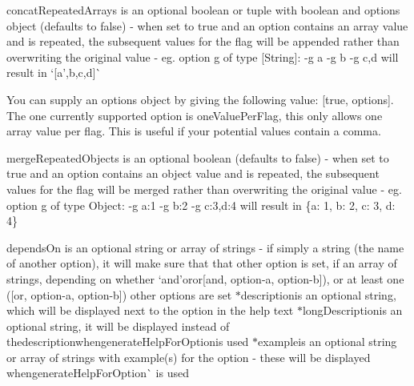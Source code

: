 \begin{DoxyItemize}
\item {\ttfamily concat\+Repeated\+Arrays} is an optional boolean or tuple with boolean and options object (defaults to {\ttfamily false}) -\/ when set to {\ttfamily true} and an option contains an array value and is repeated, the subsequent values for the flag will be appended rather than overwriting the original value -\/ eg. option {\ttfamily g} of type {\ttfamily \mbox{[}String\mbox{]}}\+: {\ttfamily -\/g a -\/g b -\/g c,d} will result in `\mbox{[}\textquotesingle{}a',\textquotesingle{}b\textquotesingle{},\textquotesingle{}c\textquotesingle{},\textquotesingle{}d\textquotesingle{}\mbox{]}\`{}

You can supply an options object by giving the following value\+: {\ttfamily \mbox{[}true, options\mbox{]}}. The one currently supported option is {\ttfamily one\+Value\+Per\+Flag}, this only allows one array value per flag. This is useful if your potential values contain a comma.
\item {\ttfamily merge\+Repeated\+Objects} is an optional boolean (defaults to {\ttfamily false}) -\/ when set to {\ttfamily true} and an option contains an object value and is repeated, the subsequent values for the flag will be merged rather than overwriting the original value -\/ eg. option {\ttfamily g} of type {\ttfamily Object}\+: {\ttfamily -\/g a\+:1 -\/g b\+:2 -\/g c\+:3,d\+:4} will result in {\ttfamily \{a\+: 1, b\+: 2, c\+: 3, d\+: 4\}}
\item {\ttfamily depends\+On} is an optional string or array of strings -\/ if simply a string (the name of another option), it will make sure that that other option is set, if an array of strings, depending on whether `\textquotesingle{}and'{\ttfamily or}\textquotesingle{}or\mbox{[}\textquotesingle{}and\textquotesingle{}, \textquotesingle{}option-\/a\textquotesingle{}, \textquotesingle{}option-\/b\textquotesingle{}\mbox{]}{\ttfamily ), or at least one (}\mbox{[}\textquotesingle{}or\textquotesingle{}, \textquotesingle{}option-\/a\textquotesingle{}, \textquotesingle{}option-\/b\textquotesingle{}\mbox{]}{\ttfamily ) other options are set $\ast$}description{\ttfamily is an optional string, which will be displayed next to the option in the help text $\ast$}long\+Description{\ttfamily is an optional string, it will be displayed instead of the}description{\ttfamily when}generate\+Help\+For\+Option{\ttfamily is used $\ast$}example{\ttfamily is an optional string or array of strings with example(s) for the option -\/ these will be displayed when}generate\+Help\+For\+Option\`{} is used
\end{DoxyItemize}

